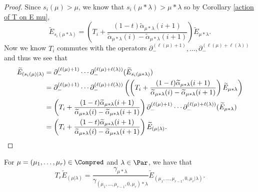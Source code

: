 \begin{proof}
Since $s_i(\mu) > \mu$, we know that $s_i(\mu*\lambda) > \mu*\lambda$ so by Corollary \ref{action of T on E mu},
$$\widetilde{E}_{s_i(\mu*\lambda)} = 
  \left( T_i + \frac{(1-t)\widetilde{\alpha}_{\mu*\lambda}(i+1)}{\widetilde{\alpha}_{\mu*\lambda}(i)- \widetilde{\alpha}_{\mu*\lambda}(i+1)} \right)  \widetilde{E}_{\mu*\lambda}. $$
Now we know $T_i$ commutes with the operators $\partial_{-}^{(\ell(\mu)+1)},\ldots , \partial_{-}^{(\ell(\mu)+\ell(
\lambda))}$ and thus we see that 
\begin{align*}
    \widetilde{E}_{(s_i(\mu)|\lambda)}&= \partial_{-}^{(\ell(\mu)+1)}\cdots \partial_{-}^{(\ell(\mu)+\ell(
\lambda))} (\widetilde{E}_{s_i(\mu*\lambda)}) \\
&= \partial_{-}^{(\ell(\mu)+1)}\cdots \partial_{-}^{(\ell(\mu)+\ell(
\lambda))} \left( \left( T_i + \frac{(1-t)\widetilde{\alpha}_{\mu*\lambda}(i+1)}{\widetilde{\alpha}_{\mu*\lambda}(i)- \widetilde{\alpha}_{\mu*\lambda}(i+1)} \right)  \widetilde{E}_{\mu*\lambda}\right) \\
&= \left( T_i + \frac{(1-t)\widetilde{\alpha}_{\mu*\lambda}(i+1)}{\widetilde{\alpha}_{\mu*\lambda}(i)- \widetilde{\alpha}_{\mu*\lambda}(i+1)} \right) \partial_{-}^{(\ell(\mu)+1)}\cdots \partial_{-}^{(\ell(\mu)+\ell(
\lambda))}(\widetilde{E}_{\mu*\lambda}) \\
&= \left( T_i + \frac{(1-t)\widetilde{\alpha}_{\mu*\lambda}(i+1)}{\widetilde{\alpha}_{\mu*\lambda}(i)- \widetilde{\alpha}_{\mu*\lambda}(i+1)} \right) \widetilde{E}_{(\mu|\lambda)}. \qedhere
\end{align*}
\end{proof}


\begin{prop}
    For $\mu = (\mu_1,\ldots, \mu_r) \in \Compred$ and $\lambda \in \Par$, we have that
    \begin{equation}
        T_r\widetilde{E}_{(\mu|\lambda)} = \frac{\gamma_{\mu*\lambda}}{\gamma_{(\mu_1,\ldots,\mu_{r-1},0,\mu_r)*\lambda}} \widetilde{E}_{(\mu_1,\ldots,\mu_{r-1},0,\mu_r|\lambda)}.
    \end{equation}
\end{prop}

